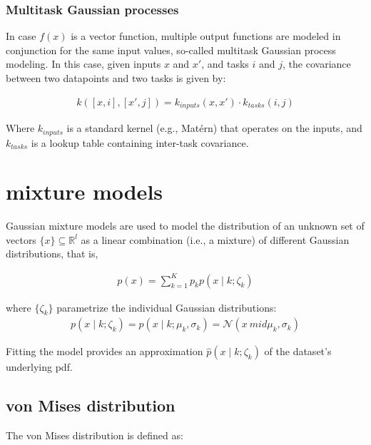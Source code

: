 \subsubsection{Multitask Gaussian processes}
In case $f(x)$ is a vector function, multiple output functions are modeled in conjunction for the same input values, so-called multitask Gaussian process modeling. In this case, given inputs $x$ and $x'$, and tasks $i$ and $j$, the covariance between two datapoints and two tasks is given by:

\begin{align}
\label{eq:2background:multitask}
    k([x,i], [x',j]) = k_{inputs}(x,x') \cdot k_{tasks}(i,j)
\end{align}

Where $k_{inputs}$ is a standard kernel (e.g., Matérn) that operates on the inputs, and $k_{tasks}$ is a lookup table containing inter-task covariance.


\section{mixture models}

Gaussian mixture models \cite{theodoridis2015machine} are used to model the distribution of an unknown set of vectors $\{x\} \subseteq \mathbb{R}^l$ as a linear combination (i.e., a mixture) of different Gaussian distributions, that is,

\begin{align}
    p(x) = \sum_{k=1}^{K}p_kp(x \mid k; \zeta_k)
\end{align}

where $\{\zeta_k\}$ parametrize the individual Gaussian distributions:
\begin{align}
    p(x \mid k ; \zeta_k) = p(x \mid k; \mu_k, \sigma_k) = \mathcal{N}(x \ mid \mu_k, \sigma_k)
\end{align}

Fitting the model provides an approximation $\hat p(x \mid k; \zeta_k)$ of the dataset's underlying pdf.

\subsection{von Mises distribution}

The von Mises distribution is defined as:

